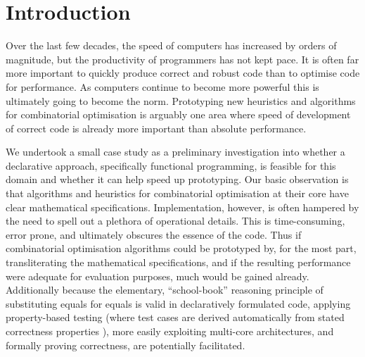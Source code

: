 \section{Introduction}

Over the last few decades, the speed of computers has increased by orders of
magnitude, but the productivity of programmers has not kept pace. It is often far more
important to quickly produce correct and robust code than to optimise code for
performance. As computers continue to become more powerful this is ultimately going to become the norm.
Prototyping new heuristics and algorithms for combinatorial optimisation is
arguably one area where speed of development of correct code is already more
important than absolute performance.

We undertook a small case study as a preliminary investigation
into whether a declarative approach, specifically functional programming, is
feasible for this domain and whether it can help speed up prototyping. Our
basic observation is that algorithms and heuristics for combinatorial
optimisation at their core have clear mathematical specifications. Implementation, however,
is often hampered by the need to spell out a plethora of
operational details. This is time-consuming, error prone, and ultimately
obscures the essence of the code. Thus if combinatorial optimisation
algorithms could be prototyped by, for the most part, transliterating the
mathematical specifications, and if the resulting performance were adequate
for evaluation purposes, much would be gained already.
Additionally because the elementary, ``school-book'' reasoning principle of
substituting equals for equals is valid in declaratively formulated code, applying property-based testing (where test cases are derived automatically from stated
correctness properties \cite{quickcheck}), more easily exploiting multi-core architectures, and formally proving correctness, are potentially facilitated.


